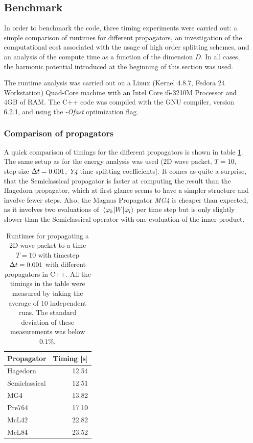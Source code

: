 \subsection{Benchmark}
\label{subsec:benchmark}
%
In order to benchmark the code, three timing experiments were carried out: a simple comparison of runtimes for different propagators, an investigation of the computational cost associated with the usage of high order splitting schemes, and an analysis of the compute time as a function of the dimension $D$.
In all cases, the harmonic potential introduced at the beginning of this section was used.
\par\medskip
%
The runtime analysis was carried out on a Linux (Kernel 4.8.7, Fedora 24 Workstation) Quad-Core machine with an Intel Core i5-3210M Processor and
4GB of RAM. The C++ code was compiled with the GNU compiler, version 6.2.1, and using the \emph{-Ofast} optimization flag.




\subsubsection{Comparison of propagators}
%
A quick comparison of timings for the different propagators is shown in table \ref{tab:speedup}.
The same setup as for the energy analysis was used (2D wave packet, $T = 10$, step size $\Delta t = 0.001$, \emph{Y4} time splitting coefficients).
It comes as quite a surprise, that the Semiclassical propagator is faster at computing the result than the Hagedorn propagator, which at first glance seems to have  a simpler structure and involve fewer steps.
Also, the Magnus Propagator \emph{MG4} is cheaper than expected, as it involves two evaluations of $\matrixel{\varphi_k}{W}{\varphi_l}$ per time step but is only slightly slower than the Semiclassical operator with one evaluation of the inner product.
%
\begin{table}[h]
	\centering
	\begin{tabular}{|l | r |} 
		\hline
		\multicolumn{1}{|c}{\textbf{Propagator}} &
		\multicolumn{1}{|c|}{\textbf{Timing [s]}} \\
		\hline
		Hagedorn & 12.54 \\
		Semiclassical & 12.51 \\
		MG4 & 13.82 \\
		Pre764 & 17.10 \\
		McL42 & 22.82 \\
		McL84 & 23.52 \\
		\hline
	\end{tabular}
	\caption{Runtimes for propagating a 2D wave packet to a time $T = 10$ with timestep $\Delta t = 0.001$ with different propagators in C++. All the timings in the table were measured by taking the average of 10 independent runs. The standard deviation of these measurements was below $0.1\%$.}
	\label{tab:speedup}
\end{table}


